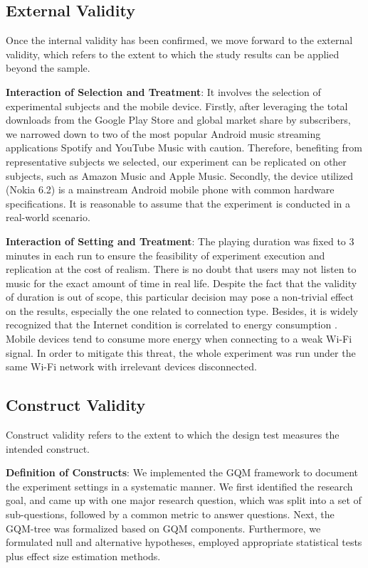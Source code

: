 \subsection{External Validity}

Once the internal validity has been confirmed, we move forward to the external validity, which refers to the extent to which the study results can be applied beyond the sample. 

\textbf{Interaction of Selection and Treatment}: It involves the selection of experimental subjects and the mobile device. Firstly, after leveraging the total downloads from the Google Play Store and global market share by subscribers, we narrowed down to two of the most popular Android music streaming applications Spotify and YouTube Music with caution. Therefore, benefiting from representative subjects we selected, our experiment can be replicated on other subjects, such as Amazon Music and Apple Music. Secondly, the device utilized (\ie Nokia 6.2) is a mainstream Android mobile phone with common hardware specifications. It is reasonable to assume that the experiment is conducted in a real-world scenario. 

\textbf{Interaction of Setting and Treatment}: The playing duration was fixed to 3 minutes in each run to ensure the feasibility of experiment execution and replication at the cost of realism. There is no doubt that users may not listen to music for the exact amount of time in real life. Despite the fact that the validity of duration is out of scope, this particular decision may pose a non-trivial effect on the results, especially the one related to connection type. Besides, it is widely recognized that the Internet condition is correlated to energy consumption \cite{32}. Mobile devices tend to consume more energy when connecting to a weak Wi-Fi signal. In order to mitigate this threat, the whole experiment was run under the same Wi-Fi network with irrelevant devices disconnected. 

\subsection{Construct Validity}
Construct validity refers to the extent to which the design test measures the intended construct. 

\textbf{Definition of Constructs}: We implemented the GQM framework \cite{wohlin2012experimentation} to document the experiment settings in a systematic manner. We first identified the research goal, and came up with one major research question, which was split into a set of sub-questions, followed by a common metric to answer questions. Next, the GQM-tree was formalized based on GQM components. Furthermore, we formulated null and alternative hypotheses, employed appropriate statistical tests plus effect size estimation methods. 

